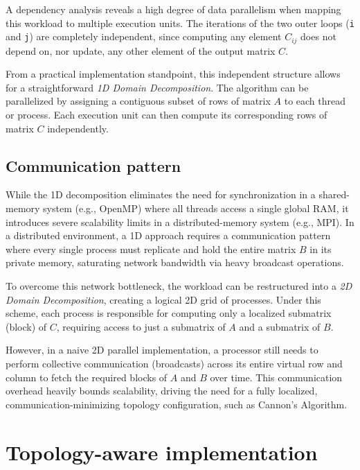 \documentclass[
  12pt,
]{article}
\begin{document}
A dependency analysis reveals a high degree of data parallelism when
mapping this workload to multiple execution units. The iterations of the
two outer loops (\texttt{i} and \texttt{j}) are completely independent,
since computing any element \(C_{ij}\) does not depend on, nor update,
any other element of the output matrix \(C\).

From a practical implementation standpoint, this independent structure
allows for a straightforward \emph{1D Domain Decomposition}. The
algorithm can be parallelized by assigning a contiguous subset of rows
of matrix \(A\) to each thread or process. Each execution unit can then
compute its corresponding rows of matrix \(C\) independently.

\subsection{Communication pattern}\label{communication-pattern}

While the 1D decomposition eliminates the need for synchronization in a
shared-memory system (e.g., OpenMP) where all threads access a single
global RAM, it introduces severe scalability limits in a
distributed-memory system (e.g., MPI). In a distributed environment, a
1D approach requires a communication pattern where every single process
must replicate and hold the entire matrix \(B\) in its private memory,
saturating network bandwidth via heavy broadcast operations.

To overcome this network bottleneck, the workload can be restructured
into a \emph{2D Domain Decomposition}, creating a logical 2D grid of
processes. Under this scheme, each process is responsible for computing
only a localized submatrix (block) of \(C\), requiring access to just a
submatrix of \(A\) and a submatrix of \(B\).

However, in a naive 2D parallel implementation, a processor still needs
to perform collective communication (broadcasts) across its entire
virtual row and column to fetch the required blocks of \(A\) and \(B\)
over time. This communication overhead heavily bounds scalability,
driving the need for a fully localized, communication-minimizing
topology configuration, such as Cannon's Algorithm.

\section{Topology-aware
implementation}\label{topology-aware-implementation}
\end{document}
